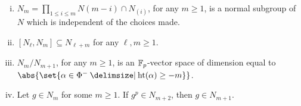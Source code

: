 \begin{lemmabreak}\label{lem:N_m}
  \begin{enumerate}[(i)]
  \item $N_m = \prod_{1 \leq i \leq m} N(m-i) \cap N_{(i)}$, for any $m \geq 1$, is a normal subgroup of $N$ which is independent of the choices made.\label{item:N_m}

  \item $[N_\ell,N_m] \subseteq N_{\ell + m}$ for any $\ell,m \geq 1$.\label{item:N_mcom}

  \item $N_m/N_{m+1}$, for any $m \geq 1$, is an $\mathbb{F}_p$-vector space of dimension equal to $\abs{\set{\alpha \in \Phi^{-} \given \Ht(\alpha) \geq -m}}$.

  \item Let $g \in N_m$ for some $m \geq 1$. If $g^p \in N_{m+2}$, then $g \in N_{m+1}$.\label{item:g^p}
  \end{enumerate}
\end{lemmabreak}
